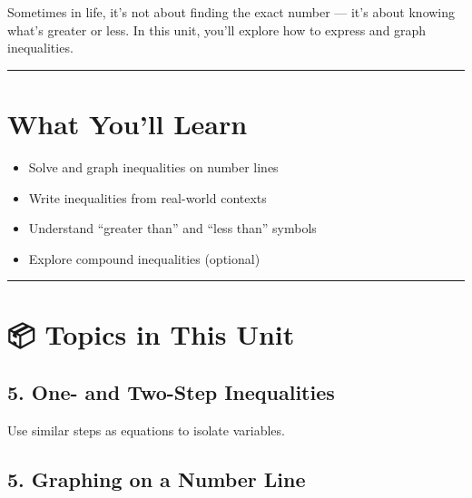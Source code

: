 \documentclass[
  letterpaper,
  DIV=11,
  numbers=noendperiod]{scrreprt}
\providecommand{\tightlist}{%
  \setlength{\itemsep}{0pt}\setlength{\parskip}{0pt}}
\begin{document}
Sometimes in life, it's not about finding the exact number --- it's
about knowing what's greater or less. In this unit, you'll explore how
to express and graph inequalities.

\begin{center}\rule{0.5\linewidth}{0.5pt}\end{center}

\section*{What You'll Learn}\label{what-youll-learn-4}


\begin{itemize}
\tightlist
\item
  Solve and graph inequalities on number lines
\item
  Write inequalities from real-world contexts
\item
  Understand ``greater than'' and ``less than'' symbols
\item
  Explore compound inequalities (optional)
\end{itemize}

\begin{center}\rule{0.5\linewidth}{0.5pt}\end{center}

\section*{📦 Topics in This Unit}\label{topics-in-this-unit-4}


\subsection*{5. One- and Two-Step
Inequalities}\label{one--and-two-step-inequalities}

Use similar steps as equations to isolate variables.

\subsection*{5. Graphing on a Number
Line}\label{graphing-on-a-number-line}
\end{document}
